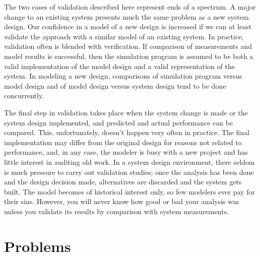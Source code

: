 The two cases of validation described here represent ends of a spectrum. A
major change to an existing system presents much the same problem as a new
system design. Our confidence in a model of a new design is increased if we
can at least validate the approach with a similar model of an existing system.
In practice, validation often is blended with verification. If comparison of
measurements and model results is successful, then the simulation program is
assumed to be both a valid implementation of the model design and a valid
representation of the system. In modeling a new design, comparisons of
simulation program versus model design and of model design versus system
design tend to be done concurrently.

The final step in validation takes place when the system change is made or the
system design implemented, and predicted and actual performance can be
compared. This, unfortunately, doesn't happen very often in practice. The
final implementation may differ from the original design for reasons not
related to performance, and, in any case, the modeler is busy with a new
project and has little interest in auditing old work. In a system design
environment, there seldom is much pressure to carry out validation studies;
once the analysis has been done and the design decision made, alternatives are
discarded and the system gets built. The model becomes of historical interest
only, so few modelers ever pay for their sins. However, you will never know
how good or bad your analysis was unless you validate its results by
comparison with system measurements.

\section{Problems}
\label{sec:model-development-problems}

